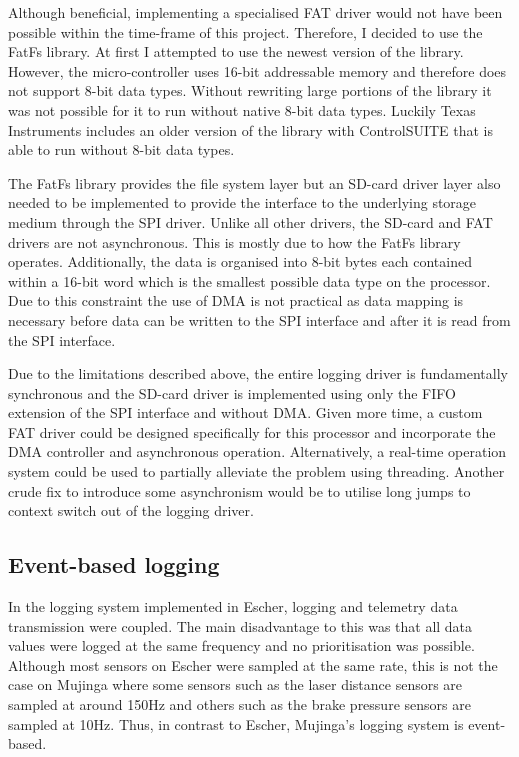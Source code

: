 Although beneficial, implementing a specialised FAT driver would not have been possible within the time-frame of this project. Therefore, I decided to use the FatFs\cite{fatfs} library. At first I attempted to use the newest version of the library. However, the micro-controller uses 16-bit addressable memory and therefore does not support 8-bit data types. Without rewriting large portions of the library it was not possible for it to run without native 8-bit data types. Luckily Texas Instruments includes an older version of the library with ControlSUITE\cite{controlsuite} that is able to run without 8-bit data types.

The FatFs library provides the file system layer but an SD-card driver layer also needed to be implemented to provide the interface to the underlying storage medium through the SPI driver. Unlike all other drivers, the SD-card and FAT drivers are not asynchronous. This is mostly due to how the FatFs library operates. Additionally, the data is organised into 8-bit bytes each contained within a 16-bit word which is the smallest possible data type on the processor. Due to this constraint the use of DMA is not practical as data mapping is necessary before data can be written to the SPI interface and after it is read from the SPI interface.

Due to the limitations described above, the entire logging driver is fundamentally synchronous and the SD-card driver is implemented using only the FIFO extension of the SPI interface and without DMA. Given more time, a custom FAT driver could be designed specifically for this processor and incorporate the DMA controller and asynchronous operation. Alternatively, a real-time operation system could be used to partially alleviate the problem using threading. Another crude fix to introduce some asynchronism would be to utilise long jumps to context switch out of the logging driver.

\subsection{Event-based logging}

In the logging system implemented in Escher, logging and telemetry data transmission were coupled. The main disadvantage to this was that all data values were logged at the same frequency and no prioritisation was possible. Although most sensors on Escher were sampled at the same rate, this is not the case on Mujinga where some sensors such as the laser distance sensors are sampled at around 150Hz and others such as the brake pressure sensors are sampled at 10Hz. Thus, in contrast to Escher, Mujinga's logging system is event-based.

